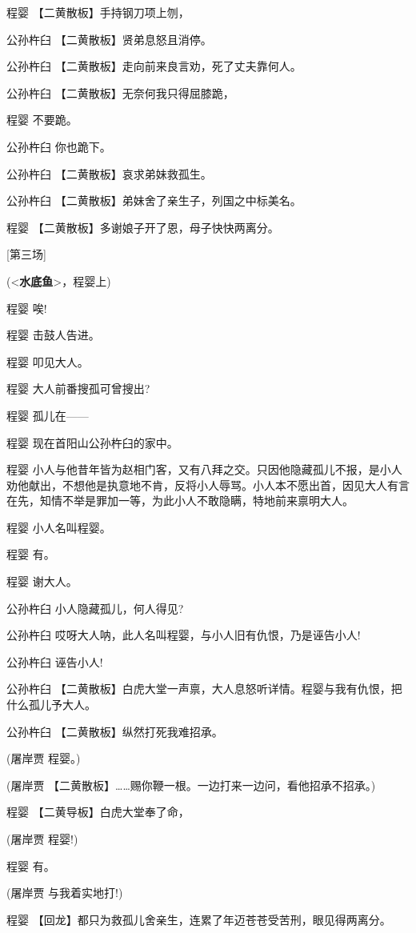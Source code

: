 程婴 【二黄散板】手持钢刀项上刎，

公孙杵臼 【二黄散板】贤弟息怒且消停。

公孙杵臼 【二黄散板】走向前来良言劝，死了丈夫靠何人。

公孙杵臼 【二黄散板】无奈何我只得屈膝跪，

程婴 不要跪。

公孙杵臼 你也跪下。

公孙杵臼 【二黄散板】哀求弟妹救孤生。

公孙杵臼 【二黄散板】弟妹舍了亲生子，列国之中标美名。

程婴 【二黄散板】多谢娘子开了恩，母子快快两离分。

{[}第三场{]}

(\textless{}\textbf{水底鱼}\textgreater{}，程婴上)

程婴 唉!

程婴 击鼓人告进。

程婴 叩见大人。

程婴 大人前番搜孤可曾搜出?

程婴 孤儿在------

程婴 现在首阳山公孙杵臼的家中。

程婴
小人与他昔年皆为赵相门客，又有八拜之交。只因他隐藏孤儿不报，是小人劝他献出，不想他是执意地不肯，反将小人辱骂。小人本不愿出首，因见大人有言在先，知情不举是罪加一等，为此小人不敢隐瞒，特地前来禀明大人。

程婴 小人名叫程婴。

程婴 有。

程婴 谢大人。

公孙杵臼 小人隐藏孤儿，何人得见?

公孙杵臼 哎呀大人呐，此人名叫程婴，与小人旧有仇恨，乃是诬告小人!

公孙杵臼 诬告小人!

公孙杵臼
【二黄散板】白虎大堂一声禀，大人息怒听详情。程婴与我有仇恨，把什么孤儿予大人。

公孙杵臼 【二黄散板】纵然打死我难招承。

(屠岸贾 程婴。)

(屠岸贾
【二黄散板】\ldots{}\ldots{}赐你鞭一根。一边打来一边问，看他招承不招承。)

程婴 【二黄导板】白虎大堂奉了命，

(屠岸贾 程婴!)

程婴 有。

(屠岸贾 与我着实地打!)

程婴 【回龙】都只为救孤儿舍亲生，连累了年迈苍苍受苦刑，眼见得两离分。

